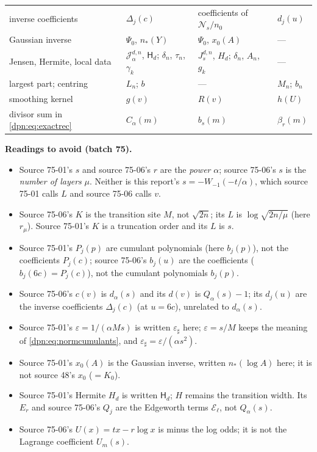 \documentclass[11pt]{article}
\numberwithin{equation}{section}
\theoremstyle{definition}\newtheorem{definition}[theorem]{Definition}
\theoremstyle{remark}\newtheorem{remark}[theorem]{Remark}
\newcommand{\eps}{\varepsilon}
\newcommand{\epsh}{\varepsilon_{\sharp}}
\begin{document}
\begin{center}
\begin{tabular}{>{\raggedright\arraybackslash}p{3.5cm}>{\raggedright\arraybackslash}p{3.5cm}>{\raggedright\arraybackslash}p{3.0cm}>{\raggedright\arraybackslash}p{3.2cm}}
inverse coefficients & $\Delta_j(c)$ & coefficients of $\mathcal N_s/n_0$ & $d_j(u)$\\
Gaussian inverse & $\Psi_0$, $n_*(Y)$ & $\Psi_0$, $x_0(A)$ & ---\\
Jensen, Hermite, local data & $\mathcal J^{d,n}_\alpha$, $\mathsf H_d$; $\delta_n$, $\tau_n$, $\gamma_k$ & $J^{d,n}_s$, $H_d$; $\delta_n$, $A_n$, $g_k$ & ---\\
largest part; centring & $L_n$; $b$ & --- & $M_n$; $b_n$\\
smoothing kernel & $g(v)$ & $R(v)$ & $h(U)$\\
divisor sum in \eqref{dpn:eq:exactrec} & $C_\alpha(m)$ & $b_s(m)$ & $\beta_r(m)$\\
\bottomrule
\end{tabular}
\end{center}
\noindent\textbf{Readings to avoid (batch 75).}
\begin{itemize}
\item Source 75-01's $s$ and source 75-06's $r$ are the \emph{power} $\alpha$;
      source 75-06's $s$ is the \emph{number of layers} $\mu$.  Neither is
      this report's $s=-W_{-1}(-t/\alpha)$, which source 75-01 calls $L$ and
      source 75-06 calls $v$.
\item Source 75-06's $K$ is the transition site $M$, not $\sqrt{2n}$; its
      $L$ is $\log\sqrt{2n/\mu}$ (here $r_\mu$).  Source 75-01's $K$ is a
      truncation order and its $L$ is $s$.
\item Source 75-01's $P_j(p)$ are cumulant polynomials (here $b_j(p)$), not
      the coefficients $P_j(c)$; source 75-06's $b_j(u)$ are the coefficients
      ($b_j(6c)=P_j(c)$), not the cumulant polynomials $b_j(p)$.
\item Source 75-06's $c(v)$ is $d_\alpha(s)$ and its $d(v)$ is
      $Q_\alpha(s)-1$; its $d_j(u)$ are the inverse coefficients $\Delta_j(c)$
      (at $u=6c$), unrelated to $d_\alpha(s)$.
\item Source 75-01's $\eps=1/(\alpha Ms)$ is written $\epsh$ here;
      $\eps=s/M$ keeps the meaning of \eqref{dpn:eq:normcumulants}, and
      $\epsh=\eps/(\alpha s^2)$.
\item Source 75-01's $x_0(A)$ is the Gaussian inverse, written $n_*(\log A)$
      here; it is not source 48's $x_0$ ($=K_0$).
\item Source 75-01's Hermite $H_d$ is written $\mathsf H_d$; $H$ remains the
      transition width.  Its $E_r$ and source 75-06's $Q_j$ are the
      Edgeworth terms $\mathcal E_\ell$, not $Q_\alpha(s)$.
\item Source 75-06's $U(x)=tx-r\log x$ is minus the log odds; it is not the
      Lagrange coefficient $U_m(s)$.
\end{itemize}
\end{document}
